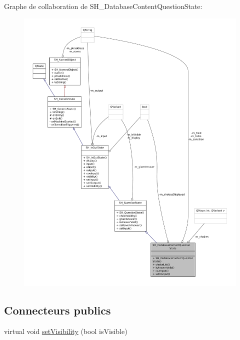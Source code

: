 Graphe de collaboration de S\-H\-\_\-\-Database\-Content\-Question\-State\-:\nopagebreak
\begin{figure}[H]
\begin{center}
\leavevmode
\includegraphics[width=350pt]{classSH__DatabaseContentQuestionState__coll__graph}
\end{center}
\end{figure}
\subsection*{Connecteurs publics}
\begin{DoxyCompactItemize}
\item 
virtual void \hyperlink{classSH__InOutState_a7706a2ea1367ab3416db27fa0f4794f7}{set\-Visibility} (bool is\-Visible)
\end{DoxyCompactItemize}
